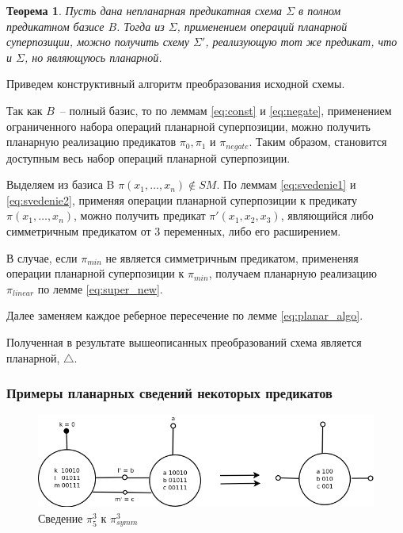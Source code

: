 \documentclass[12pt]{article}
\newtheorem{theorem}{Теорема}[section]
\newenvironment{proof}[1][Доказательство]{\begin{trivlist}
\item[\hskip \labelsep {\bfseries #1}]}{\end{trivlist}}
\begin{document}
\begin{theorem}
\label{Theo1}
Пусть дана непланарная предикатная схема $\Sigma$ в полном предикатном базисе $B$. 
Тогда из $\Sigma$, применением операций планарной суперпозиции, можно получить схему $\Sigma'$,
реализующую тот же предикат, что и $\Sigma$, но являющуюсь планарной.
\end{theorem}
\begin{proof}
Приведем конструктивный алгоритм преобразования исходной схемы.

Так как $B$~-- полный базис, то по леммам \ref{eq:const} и \ref{eq:negate}, применением ограниченного набора операций планарной
суперпозиции, можно получить планарную реализацию предикатов $\pi_0, \pi_1$ и $\pi_{negate}$. 
Таким образом, становится доступным весь набор операций планарной суперпозиции. 

Выделяем из базиса B $\pi(x_1, \dots, x_n) \notin SM$. По леммам \ref{eq:svedenie1} и \ref{eq:svedenie2}, 
применяя операции планарной суперпозиции к предикату $\pi(x_1, \dots, x_n)$, можно получить 
предикат $\pi'(x_1, x_2, x_3)$, являющийся либо симметричным предикатом от 3 переменных, либо его расширением. 

В случае, если $\pi_{min}$ не является симметричным предикатом, примененяя операции планарной суперпозиции к $\pi_{min}$,
 получаем планарную реализацию $\pi_{linear}$ по лемме \ref{eq:super_new}.

Далее заменяем каждое реберное пересечение по лемме \ref{eq:planar_algo}. 

Полученная в результате вышеописанных преобразований схема является планарной, $\bigtriangleup$.
\end{proof}

\clearpage
\subsubsection{Примеры планарных сведений некоторых предикатов}

\begin{figure}[htb]
\centering
\includegraphics[width=1.0\textwidth]{3_2to3.png}
\caption{Сведение $\pi_5^3$ к $\pi_{symm}^3$ }
\label{fig:3_2to3}
\end{figure}
\end{document}

